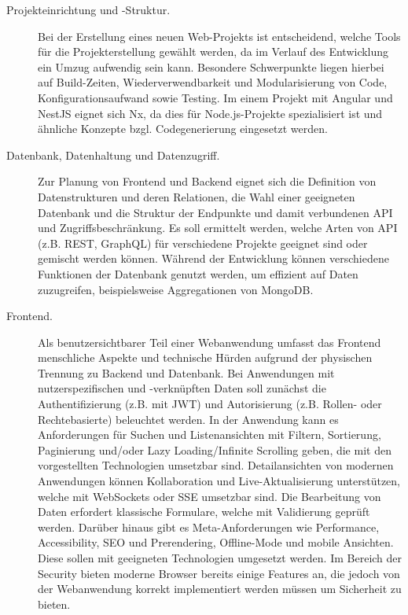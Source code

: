 \begin{description}
    \item[Projekteinrichtung und -Struktur.] Bei der Erstellung eines neuen Web-Projekts ist entscheidend, welche Tools für die Projekterstellung gewählt werden, da im Verlauf des Entwicklung ein Umzug aufwendig sein kann.
    Besondere Schwerpunkte liegen hierbei auf Build-Zeiten, Wiederverwendbarkeit und Modularisierung von Code, Konfigurationsaufwand sowie Testing.
    Im einem Projekt mit Angular und NestJS eignet sich Nx, da dies für Node.js-Projekte spezialisiert ist und ähnliche Konzepte bzgl. Codegenerierung eingesetzt werden.
    \item[Datenbank, Datenhaltung und Datenzugriff.] Zur Planung von Frontend und Backend eignet sich die Definition von Datenstrukturen und deren Relationen, die Wahl einer geeigneten Datenbank und die Struktur der Endpunkte und damit verbundenen API und Zugriffsbeschränkung.
    Es soll ermittelt werden, welche Arten von API (z.B. REST, GraphQL) für verschiedene Projekte geeignet sind oder gemischt werden können.
    Während der Entwicklung können verschiedene Funktionen der Datenbank genutzt werden, um effizient auf Daten zuzugreifen, beispielsweise Aggregationen von MongoDB.
    \item[Frontend.] Als benutzersichtbarer Teil einer Webanwendung umfasst das Frontend menschliche Aspekte und technische Hürden aufgrund der physischen Trennung zu Backend und Datenbank.
    Bei Anwendungen mit nutzerspezifischen und -verknüpften Daten soll zunächst die Authentifizierung (z.B. mit JWT) und Autorisierung (z.B. Rollen- oder Rechtebasierte) beleuchtet werden.
    In der Anwendung kann es Anforderungen für Suchen und Listenansichten mit Filtern, Sortierung, Paginierung und/oder Lazy Loading/Infinite Scrolling geben, die mit den vorgestellten Technologien umsetzbar sind.
    Detailansichten von modernen Anwendungen können Kollaboration und Live-Aktualisierung unterstützen, welche mit WebSockets oder SSE umsetzbar sind.
    Die Bearbeitung von Daten erfordert klassische Formulare, welche mit Validierung geprüft werden.
    Darüber hinaus gibt es Meta-Anforderungen wie Performance, Accessibility, SEO und Prerendering, Offline-Mode und mobile Ansichten.
    Diese sollen mit geeigneten Technologien umgesetzt werden.
    Im Bereich der Security bieten moderne Browser bereits einige Features an, die jedoch von der Webanwendung korrekt implementiert werden müssen um Sicherheit zu bieten.

\end{description}
